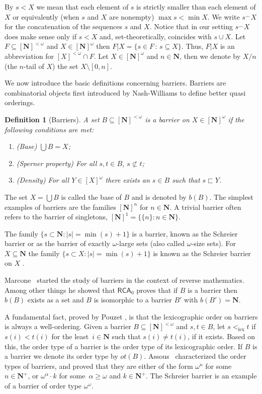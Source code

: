 \documentclass{amsart}
\theoremstyle{plain}
\theoremstyle{plain}
\newtheorem*{definition}{Definition}
\newcommand{\om}{\omega}
\newcommand{\lex}{\mathrm{lex}}
\newcommand\Nat{\mathbf{N}}
\newcommand\RCA{\mathsf{RCA}}
\newcommand\conc{^\smallfrown}
\begin{document}
By $s < X$ we mean that each element of $s$ is strictly smaller than each element of $X$ or equivalently (when $s$ and $X$ are nonempty) $\max s < \min X$. We write $s \conc X$ for the concatenation of the sequences $s$ and $X$. Notice that in our setting $s \conc X$ does make sense only if $s < X$ and, set-theoretically, coincides with $s \cup X$. Let $F\subseteq [\Nat]^{<\om}$ and $X \in [\Nat]^\om$ then $ F\vert X = \{ s \in F \,:\, s \subseteq X\}$. Thus, $F\vert X$ is an abbreviation for $[X]^{<\om}\cap F$. Let $X \in [\Nat]^\om$ and $n\in\Nat$, then we denote by $X/n$ (the $n$-tail of $X$) the set $X \setminus [0,n]$. 

We now introduce the basic definitions concerning barriers. Barriers are combinatorial objects first introduced by Nash-Williams \cite{nash-williams1968better} to define better quasi orderings. 

\begin{definition}[Barriers] \label{barrierDef}
A set $B\subseteq [\Nat]^{<\om}$ is a barrier on $X\in [\Nat]^\om$ if the following conditions are met:
\begin{enumerate}
\item (Base) $\bigcup B = X$;
\item (Sperner property) For all $s, t \in B$, $s \not\subset t$;
\item (Density) For all $Y\in [X]^\om$ there exists an $s\in B$ such that $s\sqsubset Y$. 
\end{enumerate}
\end{definition}
The set $X = \bigcup B$ is called the base of $B$ and is denoted by $b(B)$. The simplest examples of barriers are the families $[\Nat]^n$ for $n \in \Nat$. A trivial barrier often refers to the barrier of singletons, $[\Nat]^1 = \{\{ n \}  :  n \in \Nat\}$.

The family $\{ s \subset \Nat : |s| = \min(s)+1\}$ is a barrier, known as the Schreier barrier or as the barrier of exactly $\om$-large sets (also called $\om$-size sets). For $X\subseteq \Nat$ the family $\{ s \subset X  :  |s| = \min(s)+1\}$ is known as the Schreier barrier on $X$ \cite{Todorcevic+2010}.

Marcone~\cite{marcone2005wqo} started the study of barriers in the context of reverse mathematics. Among other things he showed that $\RCA_0$ proves that if $B$ is a barrier then $b(B)$ exists as a set and $B$ is isomorphic to a barrier $B'$ with $b(B') =\Nat$.

A fundamental fact, proved by Pouzet \cite{pouzet1972premeilleurordres}, is that the lexicographic order on barriers is always a well-ordering. Given a barrier $B \subseteq [\Nat]^{<\om}$ and $s, t \in B$, let $s <_\lex t$ if $s(i) < t(i)$ for the least~$i\in\Nat$ such that $s(i) \neq t(i)$, if it exists. Based on this, the order type of a barrier is the order type of its lexicographic order. If $B$ is a barrier we denote its order type by $ot(B)$. Assous~\cite{Assous} characterized the order types of barriers, and proved that they are either of the form $\om^n$ for some~$n \in \Nat^+$, or $\om^\alpha \cdot k$ for some~$\alpha \geq \om$ and $k \in \Nat^+$. The Schreier barrier is an example of a barrier of order type $\om^\om$. 
\end{document}
